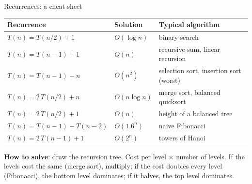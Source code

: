 \documentclass[aspectratio=169,10pt]{beamer}
\begin{document}
\begin{frame}{Recurrences: a cheat sheet}
\renewcommand{\arraystretch}{1.4}\small
\begin{tabular}{@{}>{\raggedright}p{40mm}>{\raggedright}p{32mm}>{\raggedright\arraybackslash}p{54mm}@{}}
\toprule
Recurrence & Solution & Typical algorithm\\\midrule
$T(n)=T(n/2)+1$ & $O(\log n)$ & binary search\\
$T(n)=T(n-1)+1$ & $O(n)$ & recursive sum, linear recursion\\
$T(n)=T(n-1)+n$ & $O(n^2)$ & selection sort, insertion sort (worst)\\
$T(n)=2\,T(n/2)+n$ & $O(n\log n)$ & merge sort, balanced quicksort\\
$T(n)=2\,T(n/2)+1$ & $O(n)$ & height of a balanced tree\\
$T(n)=T(n-1)+T(n-2)$ & $O(1.6^n)$ & naive Fibonacci\\
$T(n)=2\,T(n-1)+1$ & $O(2^n)$ & towers of Hanoi\\
\bottomrule
\end{tabular}
\vspace{3mm}

{\small \textbf{How to solve}: draw the recursion tree. Cost per level $\times$ number of levels. If the levels cost the same (merge sort), multiply; if the cost doubles every level (Fibonacci), the bottom level dominates; if it halves, the top level dominates.}
\end{frame}
\end{document}
